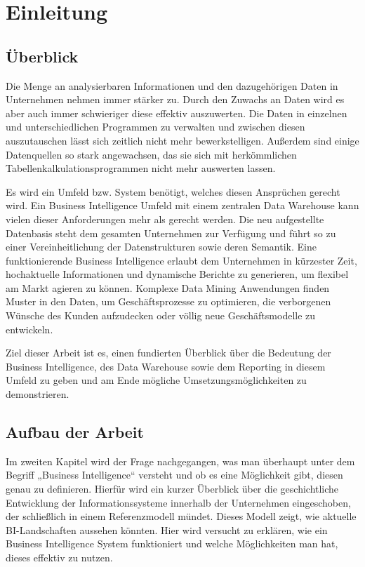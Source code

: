 \chapter{Einleitung}
\label{Kapitel:Einleitung}


\section{Überblick}
 
 Die Menge an analysierbaren  Informationen und den dazugehörigen Daten in Unternehmen nehmen immer stärker zu.  Durch den Zuwachs an Daten wird es aber auch immer schwieriger diese effektiv auszuwerten. Die  Daten in einzelnen und unterschiedlichen Programmen zu verwalten und zwischen diesen auszutauschen lässt sich zeitlich nicht mehr bewerkstelligen. Außerdem sind einige Datenquellen so stark angewachsen, das sie sich mit herkömmlichen Tabellenkalkulationsprogrammen nicht mehr auswerten lassen.
 
 
Es wird ein Umfeld bzw. System benötigt, welches diesen Ansprüchen gerecht wird. Ein Business Intelligence Umfeld mit einem zentralen Data Warehouse kann vielen dieser Anforderungen mehr als gerecht werden. Die neu aufgestellte Datenbasis steht dem gesamten Unternehmen zur Verfügung und führt so zu einer Vereinheitlichung der Datenstrukturen sowie deren Semantik. Eine funktionierende Business Intelligence erlaubt dem Unternehmen in kürzester Zeit, hochaktuelle Informationen und dynamische Berichte zu generieren, um flexibel am Markt agieren zu können. Komplexe Data Mining Anwendungen finden Muster in den Daten, um Geschäftsprozesse zu optimieren, die verborgenen Wünsche des Kunden aufzudecken oder völlig neue Geschäftsmodelle zu entwickeln.
 
Ziel dieser Arbeit ist es, einen fundierten Überblick über die Bedeutung der Business Intelligence, des Data Warehouse sowie dem Reporting in diesem Umfeld zu geben und am Ende mögliche Umsetzungsmöglichkeiten zu demonstrieren.
 
\section{ Aufbau der Arbeit}
 
Im zweiten Kapitel wird der Frage nachgegangen, was man überhaupt unter dem Begriff „Business Intelligence“ versteht und ob es eine Möglichkeit gibt, diesen genau zu definieren. Hierfür wird ein kurzer Überblick über die geschichtliche Entwicklung der Informationssysteme innerhalb der Unternehmen eingeschoben, der schließlich in einem Referenzmodell mündet. Dieses Modell zeigt, wie aktuelle BI-Landschaften aussehen könnten. Hier wird versucht zu erklären, wie ein Business Intelligence System funktioniert und welche Möglichkeiten man hat, dieses effektiv zu nutzen.
 
